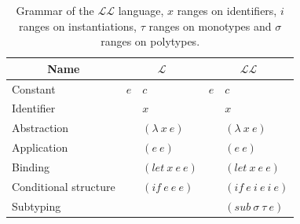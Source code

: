 \documentclass[a4paper]{report}
\newcommand{\lang}[0]{\mathcal{L}}
\begin{document}
\begin{table}
\centering
\begin{tabular}{|l||r|l||r|l|}
\hline
\multicolumn{1}{|c||}{Name} & \multicolumn{2}{|c||}{$\lang$} & \multicolumn{2}{|c||}{$\lang\lang$}\\
\hline
\hline
Constant & $e$ & $c$ & $e$ & $c$\\
Identifier && $x$ && $x$\\
Abstraction && $(\lambda\ x\ e)$ && $(\lambda\ x\ e)$\\
Application && $(e\ e)$ && $(e\ e)$\\
Binding && $(let\ x\ e\ e)$ && $(let\ x\ e\ e)$\\
Conditional structure && $(if\ e\ e\ e)$ && $(if\ e\ i\ e\ i\ e)$\\
Subtyping &&&& $(sub\ \sigma\ \tau\ e)$\\
\hline
\end{tabular}
\caption{Grammar of the $\lang\lang$ language, $x$ ranges on identifiers, $i$ ranges on instantiations, $\tau$ ranges on monotypes and $\sigma$ ranges on polytypes.}
\end{table}
\end{document}
